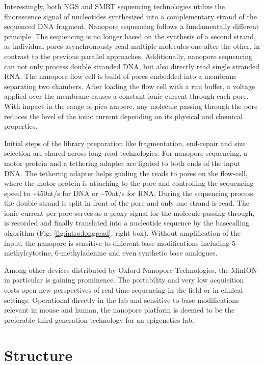 Interestingly, both NGS and SMRT sequencing technologies utilize the fluorescence signal of nucleotides synthesized into a complementary strand of the sequenced DNA fragment.
Nanopore sequencing follows a fundamentally different principle.
The sequencing is no longer based on the synthesis of a second strand, as individual pores asynchronously read multiple molecules one after the other, in contrast to the previous parallel approaches.
Additionally, nanopore sequencing can not only process double stranded DNA, but also directly read single stranded RNA.
The nanopore flow cell is build of pores embedded into a membrane separating two chambers.
After loading the flow cell with a run buffer, a voltage applied over the membrane causes a constant ionic current through each pore.
With impact in the range of pico ampere, any molecule passing through the pore reduces the level of the ionic current depending on its physical and chemical properties.

Initial steps of the library preparation like fragmentation, end-repair and size selection are shared across long read technologies.
For nanopore sequencing, a motor protein and a tethering adapter are ligated to both ends of the input DNA.
The tethering adapter helps guiding the reads to pores on the flow-cell, where the motor protein is attaching to the pore and controlling the sequencing speed to \textasciitilde450nt/s for DNA or \textasciitilde70nt/s for RNA.
During the sequencing process, the double strand is split in front of the pore and only one strand is read.
The ionic current per pore serves as a proxy signal for the molecule passing through, is recorded and finally translated into a nucleotide sequence by the basecalling algorithm (Fig. \ref{fig:intro:longread}, right box).
Without amplification of the input, the nanopore is sensitive to different base modifications including 5-methylcytosine, 6-methyladenine and even synthetic base analogues.

Among other devices distributed by Oxford Nanopore Technologies, the MinION in particular is gaining prominence. 
The portability and very low acquisition costs open new perspectives of real time sequencing in the field or in clinical settings.
Operational directly in the lab and sensitive to base modifications relevant in mouse and human, the nanopore platform is deemed to be the preferable third generation technology for an epigenetics lab.




\section{Structure}
\label{sec:intro:structure}

